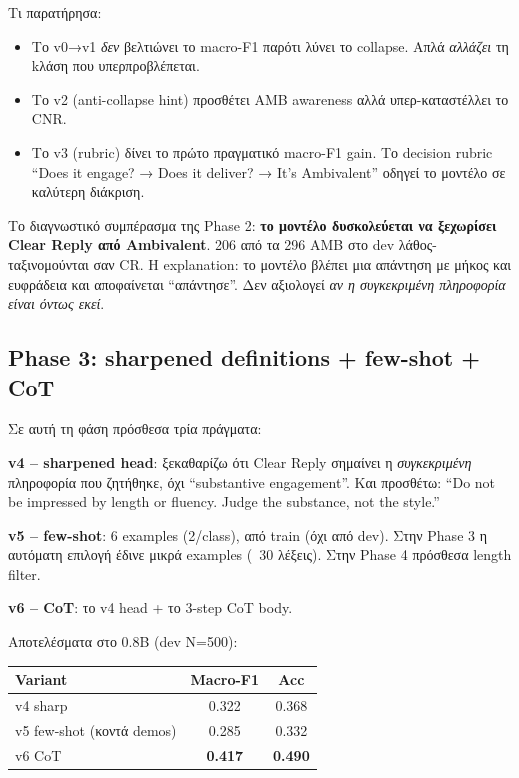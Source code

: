 \documentclass[12pt]{fphw}
\begin{document}
Τι παρατήρησα:

\begin{itemize}
    \item Το v0→v1 \emph{δεν} βελτιώνει το macro-F1 παρότι λύνει το collapse. Απλά \emph{αλλάζει} τη kλάση που υπερπροβλέπεται.
    \item Το v2 (anti-collapse hint) προσθέτει AMB awareness αλλά υπερ-καταστέλλει το CNR.
    \item Το v3 (rubric) δίνει το πρώτο πραγματικό macro-F1 gain. Το decision rubric ``Does it engage? → Does it deliver? → It's Ambivalent'' οδηγεί το μοντέλο σε καλύτερη διάκριση.
\end{itemize}

Το διαγνωστικό συμπέρασμα της Phase 2: \textbf{το μοντέλο δυσκολεύεται να ξεχωρίσει Clear Reply από Ambivalent}. 206 από τα 296 AMB στο dev λάθος-ταξινομούνται σαν CR. Η explanation: το μοντέλο βλέπει μια απάντηση με μήκος και ευφράδεια και αποφαίνεται ``απάντησε''. Δεν αξιολογεί \emph{αν η συγκεκριμένη πληροφορία είναι όντως εκεί}.

\subsection{Phase 3: sharpened definitions + few-shot + CoT}

Σε αυτή τη φάση πρόσθεσα τρία πράγματα:

\textbf{v4 -- sharpened head}: ξεκαθαρίζω ότι Clear Reply σημαίνει η \emph{συγκεκριμένη} πληροφορία που ζητήθηκε, όχι ``substantive engagement''. Και προσθέτω: ``Do not be impressed by length or fluency. Judge the substance, not the style.''

\textbf{v5 -- few-shot}: 6 examples (2/class), από train (όχι από dev). Στην Phase 3 η αυτόματη επιλογή έδινε μικρά examples (~30 λέξεις). Στην Phase 4 πρόσθεσα length filter.

\textbf{v6 -- CoT}: το v4 head + το 3-step CoT body.

Αποτελέσματα στο 0.8B (dev N=500):

\begin{table}[H]
\centering
\begin{tabular}{lcc}
\toprule
Variant & Macro-F1 & Acc \\
\midrule
v4 sharp & 0.322 & 0.368 \\
v5 few-shot (κοντά demos) & 0.285 & 0.332 \\
v6 CoT & \textbf{0.417} & \textbf{0.490} \\
\bottomrule
\end{tabular}
\end{table}
\end{document}
